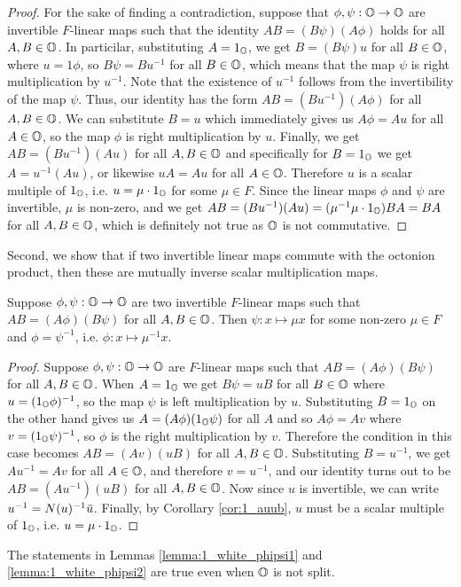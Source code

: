 \begin{proof}
    For the sake of finding a contradiction, suppose that $\phi,\psi : \mathbb{O} \rightarrow \mathbb{O}$ are
    invertible $F$-linear maps such that the identity $AB = (B\psi)(A\phi)$ holds for all \mbox{$A,B\in \mathbb{O}$}.
    In particilar, substituting $A = 1_{\mathbb{O}}$, we get $B = (B\psi) u$ for all $B \in \mathbb{O}$, where $u = 1 \phi$,
    so $B \psi = B u^{-1}$ for all $B \in \mathbb{O}$, which means that the map $\psi$ is right
    multiplication by $u^{-1}$. Note that the existence of $u^{-1}$ follows from the
    invertibility of the map $\psi$. Thus, our identity has the form $AB = (B u^{-1}) (A\phi)$
    for all $A,B \in \mathbb{O}$. We can substitute $B = u$ which immediately gives us $A\phi = Au$ for
    all $A \in \mathbb{O}$, so the map $\phi$ is right multiplication by $u$. Finally, we get
    $AB = (B u^{-1}) (A u)$ for all $A,B \in \mathbb{O}$ and specifically for $B = 1_{\mathbb{O}}$ we get
    $A = u^{-1} (A u)$, or likewise $u A = A u$ for all $A \in \mathbb{O}$. Therefore $u$ is a
    scalar multiple of $1_{\mathbb{O}}$, i.e. $u = \mu \cdot 1_{\mathbb{O}}$ for some $\mu \in F$.
    Since the linear maps $\phi$ and $\psi$ are invertible, $\mu$ is non-zero, and we get
    $AB = (Bu^{-1})(Au) = (\mu^{-1} \mu \cdot 1_{\mathbb{O}}) BA = BA$ for all $A,B \in \mathbb{O}$, which is definitely
    not true as $\mathbb{O}$ is not commutative.
\end{proof}

Second, we show that if two invertible linear maps commute with the octonion product, then
these are mutually inverse scalar multiplication maps.

\begin{lemma}
    \label{lemma:1_white_phipsi2}
    Suppose $\phi,\psi: \mathbb{O} \rightarrow \mathbb{O}$ are two invertible $F$-linear maps such that
    \mbox{$AB = (A\phi) (B\psi)$} for all $A,B \in \mathbb{O}$. Then $\psi : x \mapsto \mu x$
    for some non-zero $\mu \in F$ and $\phi = \psi^{-1}$, i.e. $\phi : x \mapsto \mu^{-1} x$.
\end{lemma}

\begin{proof}
    Suppose $\phi, \psi: \mathbb{O} \rightarrow \mathbb{O}$ are $F$-linear maps such that
    $AB = (A\phi) (B\psi)$ for all $A,B \in \mathbb{O}$. When $A=1_{\mathbb{O}}$ we get $B\psi = uB$ for all
    $B \in \mathbb{O}$ where $u = (1_{\mathbb{O}}\phi)^{-1}$, so
    the map $\psi$ is left multiplication by $u$.
    Substituting $B = 1_{\mathbb{O}}$ on the other hand gives
    us $A = (A\phi) (1_{\mathbb{O}}\psi)$ for all $A$ and so $A\phi = A v$ where $v =
    (1_{\mathbb{O}}\psi)^{-1}$, so $\phi$ is the right multiplication by $v$.
    Therefore the condition in this case becomes $AB = (Av)(uB)$
    for all $A,B \in \mathbb{O}$. Substituting $B = u^{-1}$, we get $Au^{-1} = Av$ for all
    $A \in \mathbb{O}$, and therefore $v = u^{-1}$, and our identity turns out to be
    $AB = (Au^{-1})(uB)$ for
    all $A,B\in \mathbb{O}$. Now since $u$ is invertible, we can write $u^{-1} = N(u)^{-1} \mathord{\mbox{\hspace*{0pt}}\,\overline{\!u\!\!\;}\!\:}\mbox{\hspace*{0pt}}$.
    Finally, by Corollary \ref{cor:1_auub}, $u$ must be a scalar multiple of $1_{\mathbb{O}}$,
    i.e. $u = \mu \cdot 1_{\mathbb{O}}$.
\end{proof}

The statements in Lemmas \ref{lemma:1_white_phipsi1} and \ref{lemma:1_white_phipsi2} are
true even when $\mathbb{O}$ is not split. 




